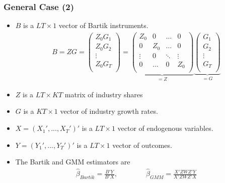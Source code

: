 \documentclass[english,xcolor=svgnames]{beamer}
\begin{document}
\begin{frame}
\frametitle[alignment=center]{General Case (2)}
\begin{itemize}
	\item $B$ is a $LT\times 1$ vector of Bartik instruments.
	\begin{align*}
		B=ZG = \begin{pmatrix}
			Z_0G_1 \\
			Z_0G_2 \\
			\vdots  \\
			Z_0 G_T \\
		\end{pmatrix} =
		\underbrace{\begin{pmatrix}
			Z_0 & 0 & \hdots & 0 \\
			0 & Z_0 & \hdots & 0 \\
			\vdots & 0 & \ddots & \vdots \\
			0 & \hdots & 0 & Z_0 \\
		\end{pmatrix}}_{=Z} \underbrace{\begin{pmatrix}
			G_1 \\
			G_2 \\
			\vdots  \\
			 G_T \\
		\end{pmatrix}}_{=G}
	\end{align*}
	\item $Z$ is a $LT\times KT$ matrix of industry shares
	\item $G$ is a $KT\times 1$ vector of industry growth rates.
	\item $X=(X_{1}',...,X_{T}')'$ is a $LT\times 1$ vector of endogenous variables.
	\item $Y=(Y_{1}',...,Y_{T}')'$ is a $LT\times 1$ vector of outcomes.
	\item The Bartik and GMM estimators are
	\begin{align*}
		\hat{\beta}_{Bartik} = \frac{B'Y}{B'X},\qquad\qquad \hat{\beta}_{GMM}=\frac{X'Z W Z'Y}{X'Z W Z'X}
	\end{align*}
\end{itemize}
\end{frame}
\end{document}
